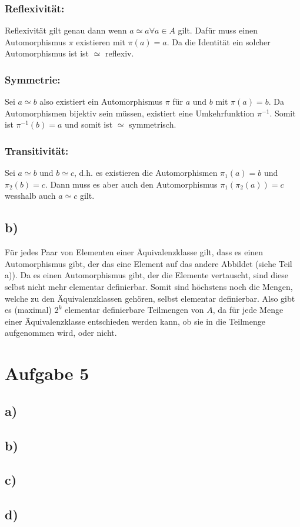 \documentclass[11pt, a4paper]{article}
\begin{document}
\subsubsection*{Reflexivität:}
Reflexivität gilt genau dann wenn $a \simeq a \forall a \in A$ gilt.
Dafür muss einen Automorphismus $\pi$ existieren mit $\pi(a) = a$.
Da die Identität ein solcher Automorphismus ist ist $\simeq$ reflexiv.

\subsubsection*{Symmetrie:}
Sei $a \simeq b$ also existiert ein Automorphismus $\pi$ für $a$ und $b$ mit $\pi(a) = b$.
Da Automorphismen bijektiv sein müssen, existiert eine Umkehrfunktion $\pi^{-1}$.
Somit ist $\pi^{-1}(b) = a$ und somit ist $\simeq$ symmetrisch.


\subsubsection*{Transitivität:}
Sei $a \simeq b$ und $b \simeq c$, d.h. es existieren die Automorphismen $\pi_1(a) = b$ und $\pi_2(b) = c$.
Dann muss es aber auch den Automorphismus $\pi_1(\pi_2(a)) = c$ wesshalb auch $a \simeq c$ gilt.


\subsection*{b)}

Für jedes Paar von Elementen einer Äquivalenzklasse gilt, dass es einen Automorphismus gibt, der das eine Element auf das andere Abbildet (siehe Teil a)).
Da es einen Automorphismus gibt, der die Elemente vertauscht, sind diese selbst nicht mehr elementar definierbar.
Somit sind höchstens noch die Mengen, welche zu den Äquivalenzklassen gehören, selbst elementar definierbar.
Also gibt es (maximal) $2^k$ elementar definierbare Teilmengen von $A$, da für jede Menge einer Äquivalenzklasse entschieden werden kann, ob sie in die Teilmenge aufgenommen wird, oder nicht.



\section*{Aufgabe 5}

\subsection*{a)}


\subsection*{b)}

\subsection*{c)}

\subsection*{d)}
\end{document}
